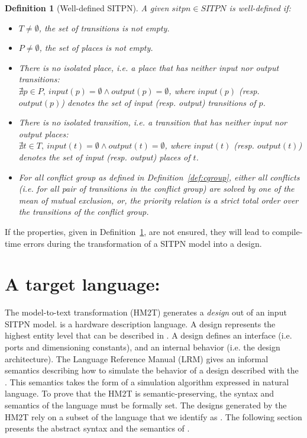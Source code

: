 \documentclass[pdflatex,sn-mathphys]{sn-jnl}%
\theoremstyle{thmstyleone}%
\theoremstyle{thmstyletwo}%
\theoremstyle{thmstylethree}%
\newtheorem{definition}{Definition}%
\begin{document}
\begin{definition}[Well-defined SITPN]\label{def:wd-sitpn}
  A given $sitpn\in{}SITPN$ is well-defined if:
  \begin{itemize}
  \item $T\neq\emptyset$, the set of transitions is not empty.
  \item $P\neq\emptyset$, the set of places is not empty.
  \item There is no isolated place, i.e. a place that has neither
    input nor output transitions:\\
    $\nexists{}p\in{}P,~input(p)=\emptyset\wedge{}output(p)=\emptyset$,
    where $input(p)$ (resp. $output(p)$) denotes the set of input
    (resp. output) transitions of $p$.
  \item There is no isolated transition, i.e. a transition that has
    neither
    input nor output places:\\
    $\nexists{}t\in{}T,~input(t)=\emptyset\wedge{}output(t)=\emptyset$,
    where $input(t)$ (resp. $output(t)$) denotes the set of input
    (resp. output) places of $t$.
  \item For all conflict group as defined in
    Definition~\ref{def:cgroup}, either all conflicts (i.e. for all
    pair of transitions in the conflict group) are solved by one of
    the mean of mutual exclusion, or, the priority relation is a
    \emph{strict total} order over the transitions of the conflict group.
  \end{itemize}
\end{definition}

If the properties, given in Definition~\ref{def:wd-sitpn}, are not
ensured, they will lead to compile-time errors during the
transformation of a SITPN model into a \vhdl{} design.

\section{A target language: \hvhdl{}}
\label{sec:hvhdl}

The \hilecop{} model-to-text transformation (HM2T) generates a \vhdl{}
\emph{design} out of an input SITPN model.  \vhdl{} is a hardware
description language. A design represents the highest entity level
that can be described in \vhdl{}. A design defines an interface
(i.e. ports and dimensioning constants), and an internal behavior
(i.e. the design architecture). The \vhdl{} Language Reference Manual
(LRM) \cite{VHDL2000} gives an informal semantics describing how to
simulate the behavior of a design described with the \vhdl{}. This
semantics takes the form of a simulation algorithm expressed in
natural language. To prove that the HM2T is semantic-preserving, the
syntax and semantics of the \vhdl{} language must be formally set. The
designs generated by the HM2T rely on a subset of the \vhdl{} language
that we identify as \hvhdl{}. The following section presents the
abstract syntax and the semantics of \hvhdl{}.
\end{document}
